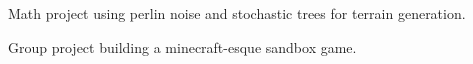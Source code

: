 \documentclass{article}
\begin{document}
\begin{slide}[H]
\centering
{}
	\vspace{-3mm}

	Math project using perlin noise and stochastic trees for terrain generation.
\endminipage\hfill
{}
	\vspace{-3mm}

	Group project building a minecraft-esque sandbox game.
\endminipage\hfill
\end{slide}
\vspace{-3mm}
\end{document}
